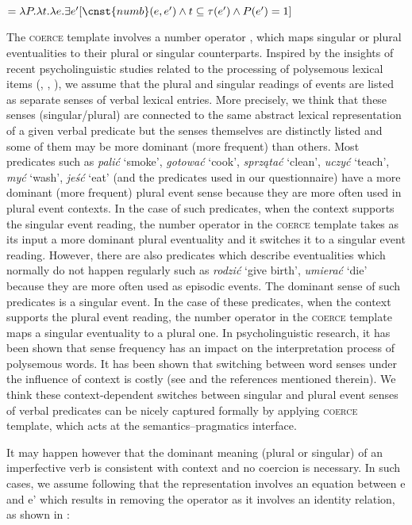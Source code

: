 \documentclass[output=paper]{langscibook}
\begin{document}
\ea {} $= \lambda P. \lambda t.\lambda e. \exists e' [\cnst{numb} (e, e') \wedge t \subseteq \tau(e') \wedge P(e')=1]$\label{jan-bla:fansb:kb:ex30}
\z 

\noindent The \textsc{coerce} template involves a number operator , which maps singular or plural eventualities to their plural or singular counterparts. Inspired by the insights of recent psycholinguistic studies related to the processing of polysemous lexical items (\citealt{KleinandMurphy2002}, \citealt{PylkkänenLlinásandMurphy2006}, \citealt{Frisson2015}), we assume that the plural and singular readings of events are listed as separate senses of verbal lexical entries. More precisely, we think that these senses (singular/plural) are connected to the same abstract lexical representation of a given verbal predicate but the senses themselves are distinctly listed and some of them may be more dominant (more frequent) than others.  Most predicates such as \textit{palić} ‘smoke’, \textit{gotować} ‘cook’, \textit{sprzątać} ‘clean’, \textit{uczyć} ‘teach’, \textit{myć} ‘wash’, \textit{jeść} ‘eat’ (and the predicates used in our questionnaire) have a more dominant (more frequent) plural event sense because they are more often used in plural event contexts. In the case of such predicates, when the context supports the singular event reading, the number operator in the \textsc{coerce} template takes as its input a more dominant plural eventuality and it switches it to a singular event reading. However, there are also predicates which describe eventualities which normally do not happen regularly such as \textit{rodzić} ‘give birth’, \textit{umierać} ‘die’ because they are more often used as episodic events. The dominant sense of such predicates is a singular event. In the case of these predicates, when the context supports the plural event reading, the number operator in the \textsc{coerce} template maps a singular eventuality to a plural one. In psycholinguistic research, it has been shown that sense frequency has an impact on the interpretation process of polysemous words. It has been shown that switching between word senses under the influence of context is costly (see \citealt{Frisson2015} and the references mentioned therein). We think these context-dependent switches between singular and plural event senses of verbal predicates can be nicely captured formally by applying  \textsc{coerce} template, which acts at the semantics--pragmatics interface.

It may happen however that the dominant meaning (plural or singular) of an imperfective verb is consistent with context and no coercion is necessary. In such cases, we assume following \citet{Dolling2014} that the representation involves an equation between e and e’ which results in removing the  operator as it involves an identity relation, as shown in :
\end{document}
